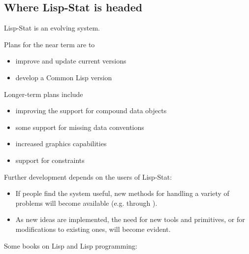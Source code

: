 \begin{slide}{}
\section{Where Lisp-Stat is headed}
Lisp-Stat is an evolving system.

Plans for the near term are to
\begin{itemize}
\item improve and update current versions
\item develop a Common Lisp version
\end{itemize}
Longer-term plans include
\begin{itemize}
\item improving the support for compound data objects
\item some support for missing data conventions
\item increased graphics capabilities
\item support for constraints
\end{itemize}
\end{slide}

\begin{slide}{}
Further development depends on the users of Lisp-Stat:
\begin{itemize}
\item
If people find the system useful, new methods for handling a variety
of problems will become available (e.g. through ).
\item
As new ideas are implemented, the need for new tools and primitives,
or for modifications to existing ones, will become evident.
\end{itemize}
\end{slide}

\begin{slide}{}
Some books on Lisp and Lisp programming:




\end{slide}
